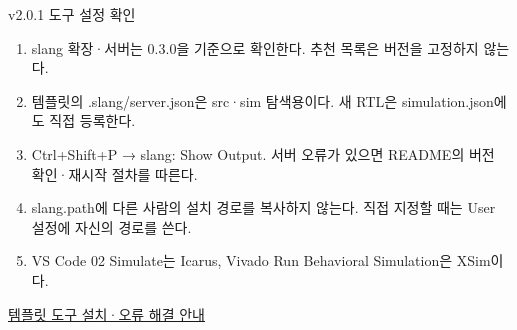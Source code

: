 \begin{frame}{v2.0.1 도구 설정 확인}
\small
\begin{enumerate}
\item slang 확장·서버는 0.3.0을 기준으로 확인한다. 추천 목록은 버전을 고정하지 않는다.
\item 템플릿의 .slang/server.json은 src·sim 탐색용이다. 새 RTL은 simulation.json에도 직접 등록한다.
\item Ctrl+Shift+P → slang: Show Output. 서버 오류가 있으면 README의 버전 확인·재시작 절차를 따른다.
\item slang.path에 다른 사람의 설치 경로를 복사하지 않는다. 직접 지정할 때는 User 설정에 자신의 경로를 쓴다.
\item VS Code 02 Simulate는 Icarus, Vivado Run Behavioral Simulation은 XSim이다.
\end{enumerate}\href{https://github.com/Glaysia/fpga-lab-template/tree/v2.0.1\#3-실행-준비}{템플릿 도구 설치·오류 해결 안내}
\end{frame}

